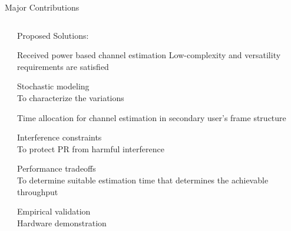 \documentclass[16pt]{beamer}
\newcommand{\fs}[2]{\fontsize{#1 pt}{#2}\selectfont}
\begin{document}
\begin{frame}[t]{Major Contributions}
\begin{columns}
		\begin{column}{0.03\columnwidth}
		\end{column}
		
		\begin{column}[t]{0.44\columnwidth}
			\centering Proposed Solutions: \\[-0.2em]
				\fs{7}{8}
			\fs{7}{8}
			\begin{block}{}
				\centering
				Received power based channel estimation
					Low-complexity and versatility requirements are satisfied  
			\end{block}
			\vspace{-0.5mm}
			\onslide<2->
			{
			\begin{block}{}
				\centering
			  	Stochastic modeling \\ To characterize the variations 	
			\end{block}
			\vspace{-0.5mm}
			\begin{block}{}
				\centering
			   	Time allocation for channel estimation in secondary user's frame structure
			\end{block}
			}
			\vspace{-0.5mm}
			\onslide<3->
			{
			\begin{block}{}
				\centering
			  	Interference constraints  \\To protect PR from harmful interference 
			\end{block}
			}	
			\vspace{-0.5mm}
			\onslide<3->
			{
			\begin{block}{}
				\centering
			 	Performance tradeoffs \\ To determine suitable estimation time that determines the achievable throughput	
			\end{block}
			}
			\vspace{-0.4mm}
			\onslide<4->
			{
			\begin{block}{}%
				\centering
				Empirical validation \\ Hardware demonstration
			\end{block}
			}
		\end{column}
	\end{columns}
\end{frame}
\end{document}
